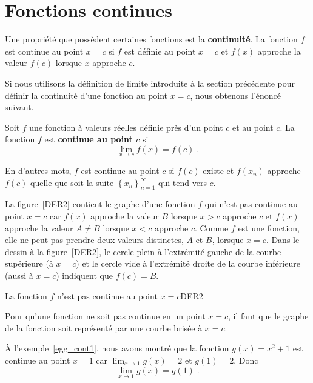 {\section{Fonctions continues}

Une propriété que possèdent certaines fonctions est la
{\bfseries continuité}.  La fonction $f$ est continue au point $x=c$
si $f$ est définie au point $x=c$ et $f(x)$ approche la valeur $f(c)$
lorsque $x$ approche $c$.

Si nous utilisons la définition de limite introduite à la section
précédente pour définir la continuité d'une fonction au point $x=c$,
nous obtenons l'énoncé suivant.

\begin{focus}{\dfn} 
Soit $f$ une fonction à valeurs réelles définie près d'un point $c$ et
au point $c$.  La fonction $f$ est {\bfseries continue au point $c$}
si
\[
\lim_{x\rightarrow c} f(x) = f(c)  \; .
\]
\end{focus}

En d'autres mots, $f$ est continue au point $c$ si $f(c)$ existe et
$f(x_n)$ approche $f(c)$ quelle que soit la suite
$\displaystyle \left\{x_n\right\}_{n=1}^\infty$ qui tend vers $c$.

La figure~\ref{DER2} contient le graphe d'une fonction $f$ qui
n'est pas continue au point $x=c$ car $f(x)$ approche la valeur $B$
lorsque $x>c$ approche $c$ et $f(x)$ approche la valeur $A\neq B$
lorsque $x<c$ approche $c$.  Comme $f$ est une fonction, elle ne peut
pas prendre deux valeurs distinctes, $A$ et $B$, lorsque $x=c$.  Dans
le dessin à la figure~\ref{DER2}, le cercle plein à l'extrémité gauche de la
courbe supérieure (à $x=c$) et le cercle vide à l'extrémité droite de
la courbe inférieure (aussi à $x=c$) indiquent que $f(c)=B$.

{La fonction $f$ n'est pas continue au point $x=c$}{DER2}

Pour qu'une fonction ne soit pas continue en un point $x=c$, il faut
que le graphe de la fonction soit représenté par une courbe brisée à
$x=c$.

\begin{egg}
À l'exemple~\ref{egg_cont1}, nous avons montré que la fonction
$g(x) = x^2+1$ est continue au point $x=1$ car
$\displaystyle \lim_{x\rightarrow 1} g(x) = 2$ et $g(1)=2$. 
Donc
\[
\displaystyle \lim_{x\rightarrow 1} g(x) = g(1) \; .
\]
\end{egg}

}
